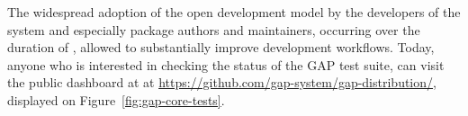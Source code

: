 %
%

The widespread adoption of the open development model by the
developers of the \GAP system and especially package authors and
maintainers, occurring over the duration of \ODK, allowed \GAP
to substantially improve development workflows.
Today, anyone who is interested in checking the
status of the GAP test suite, can visit the public dashboard at
at \url{https://github.com/gap-system/gap-distribution/}, 
displayed on Figure~\ref{fig:gap-core-tests}.

